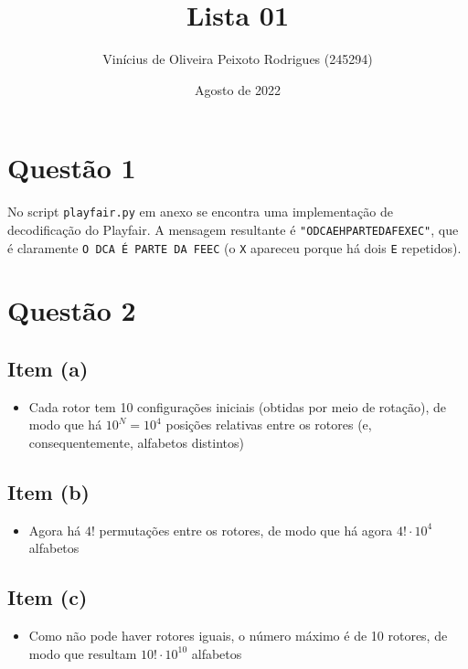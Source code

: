 \documentclass{article}
\title{Lista 01}
\author{Vinícius de Oliveira Peixoto Rodrigues (245294)}
\date{Agosto de 2022}
\begin{document}
\maketitle

\section*{Questão 1}

No script \texttt{playfair.py} em anexo se encontra uma implementação de decodificação do Playfair. A mensagem resultante é \texttt{"ODCAEHPARTEDAFEXEC"}, que é claramente \texttt{O DCA É PARTE DA FEEC} (o \texttt{X} apareceu porque há dois \texttt{E} repetidos).

\section*{Questão 2}

\subsection*{Item (a)}

\begin{itemize}
    \item Cada rotor tem 10 configurações iniciais (obtidas por meio de rotação), de modo que há $10^N = 10^4$ posições relativas entre os rotores (e, consequentemente, alfabetos distintos)
\end{itemize}

\subsection*{Item (b)}

\begin{itemize}
    \item Agora há $4!$ permutações entre os rotores, de modo que há agora $4! \cdot 10^4$ alfabetos
\end{itemize}

\subsection*{Item (c)}

\begin{itemize}
    \item Como não pode haver rotores iguais, o número máximo é de 10 rotores, de modo que resultam $10! \cdot 10^{10}$ alfabetos
\end{itemize}
\end{document}
